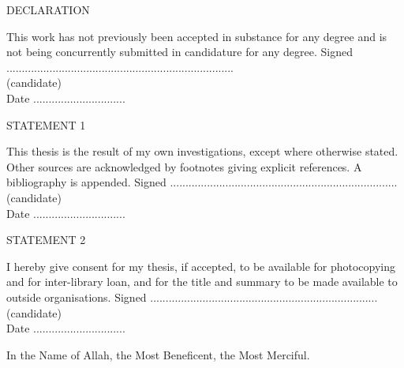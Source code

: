 \begin{titlepage}
\newpage
\noindent
\begin{Large}
\noindent
DECLARATION\\
\end{Large}
\newline	
This work has not previously been accepted in substance for any degree and is not being concurrently submitted in candidature for any degree.	
\newline
\newline
Signed ..........................................................................\\
(candidate)	\\
\newline
Date ..............................\\
\newline
\newline
\begin{large}
\noindent
STATEMENT 1\\
\end{large}
\newline
This thesis is the result of my own investigations, except where otherwise stated. Other sources are acknowledged by footnotes giving explicit references.  A bibliography is appended.
\newline
\newline
Signed ..........................................................................\\
(candidate)	\\
\newline
Date ..............................\\
\newline
\newline
\begin{large}
\noindent
STATEMENT 2	\\
\end{large}
\newline
I hereby give consent for my thesis, if accepted, to be available for photocopying and for inter-library loan, and for the title and summary to be made available to outside organisations.	
\newline
\newline
Signed ..........................................................................\\
(candidate)	\\
\newline
Date ..............................\\
\newpage
\thispagestyle{empty}	
\begin{center}
\noindent
\large
In the Name of Allah, the Most Beneficent, the Most Merciful.
\end{center}
%

\end{titlepage}
